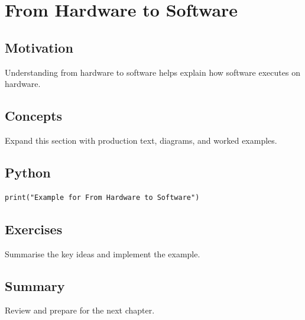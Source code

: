 \chapter{From Hardware to Software}
\label{chap:30}



\section{Motivation}
Understanding from hardware to software helps explain how software executes on hardware.

\section{Concepts}
Expand this section with production text, diagrams, and worked examples.

\section{Python}
\begin{lstlisting}
print("Example for From Hardware to Software")
\end{lstlisting}

\section{Exercises}
\begin{exercise}
Summarise the key ideas and implement the example.
\end{exercise}

\section{Summary}
Review and prepare for the next chapter.
